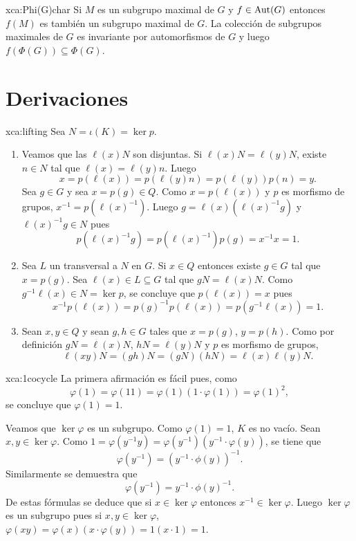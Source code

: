 \begin{sol}{xca:Phi(G)char}
	Si $M$ es un subgrupo maximal de $G$ y $f\in\operatorname{Aut}(G)$ entonces $f(M)$ es
	también un subgrupo maximal de $G$. La colección de subgrupos maximales de
	$G$ es invariante por automorfismos de $G$ y luego $f(\Phi(G))\subseteq
	\Phi(G)$.
\end{sol}

\section*{Derivaciones}

\begin{sol}{xca:lifting}
	Sea $N=\iota(K)=\ker p$. 
	\begin{enumerate}
		\item Veamos que las $\ell(x)N$ son disjuntas. 
			Si $\ell(x)N=\ell(y)N$, existe $n\in N$ tal que
			$\ell(x)=\ell(y)n$. Luego 
			\[
			x=p(\ell(x))=p(\ell(y)n)=p(\ell(y))p(n)=y.
			\]
			Sea $g\in G$ y sea $x=p(g)\in Q$. Como $x=p(\ell(x))$ y $p$ es
			morfismo de grupos, $x^{-1}=p(\ell(x)^{-1})$. Luego
			$g=\ell(x)\left(\ell(x)^{-1}g\right)$ y $\ell(x)^{-1}g\in N$ pues
			\[
			p(\ell(x)^{-1}g)=p(\ell(x)^{-1})p(g)=x^{-1}x=1.
			\]
		\item Sea $L$ un transversal a $N$ en $G$. Si $x\in Q$ entonces existe
			$g\in G$ tal que $x=p(g)$.  Sea $\ell(x)\in L\subseteq G$ tal que
			$gN=\ell(x)N$. Como $g^{-1}\ell(x)\in N=\ker p$, se concluye que
			$p(\ell(x))=x$ pues 
			\[
			x^{-1}p(\ell(x))=p(g)^{-1}p(\ell(x))=p(g^{-1}\ell(x))=1.
			\]
		\item Sean $x,y\in Q$ y sean $g,h\in G$ tales que $x=p(g)$, $y=p(h)$. 
			Como por definición $gN=\ell(x)N$, $hN=\ell(y)N$ y $p$ es morfismo de grupos, 
			\[
				\ell(xy)N=(gh)N=(gN)(hN)=\ell(x)\ell(y)N.
			\]
	\end{enumerate}
\end{sol}


\begin{sol}{xca:1cocycle}
	La primera afirmación es fácil pues, como 
	\[
		\varphi(1)=\varphi(11)=\varphi(1)(1\cdot \varphi(1))=\varphi(1)^2,
	\]
	se concluye que $\varphi(1)=1$. 
	
	Veamos que $\ker\varphi$ es un subgrupo. 
	Como $\varphi(1)=1$, $K$ es no vacío. Sean
	$x,y\in \ker\varphi$. Como $1=\varphi(y^{-1}y)=\varphi(y^{-1})(y^{-1}\cdot
	\varphi(y))$, se tiene que
	\[
	\varphi(y^{-1})=(y^{-1}\cdot\phi(y))^{-1}.
	\]
	Similarmente se demuestra que 
	\[
		\varphi(y^{-1})=y^{-1}\cdot\phi(y)^{-1}.
	\]
	De estas fórmulas se deduce que si $x\in \ker\varphi$ entonces
	$x^{-1}\in \ker\varphi$. Luego $\ker\varphi$ es un subgrupo pues si $x,y\in \ker\varphi$, 
	$\varphi(xy)=\varphi(x)(x\cdot \varphi(y))=1(x\cdot 1)=1$. 
\end{sol}

